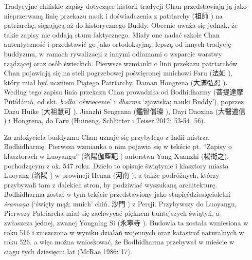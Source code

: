 Tradycyjne chińskie zapisy dotyczące historii tradycji Chan przedstawiają ją jako nieprzerwaną linię przekazu nauk i doświadczenia z patriarchy (祖師 ) na patriarchę, sięgającą aż do historycznego Buddy.
Obecnie uważa się jednak, że takie zapisy nie oddają stanu faktycznego.
Miały one nadać szkole Chan autentyczność i przedstawić go jako ortodoksyjną, lepszą od innych tradycję buddyzmu, w ramach rywalizacji z innymi odłamami o wsparcie warstwy rządzącej oraz osób świeckich.
Pierwsze wzmianki o linii przekazu patriarchów Chan pojawiają się na steli pogrzebowej poświęconej mnichowi Faru (法如 ), który miał być uczniem Piątego Patriarchy, Daman Hongrena (大滿弘忍 ).
Według tego zapisu linia przekazu Chan prowadziła od Bodhidharmy (菩提達摩 Pútídámó, od skt. \textit{bodhi} `oświecenie' i \textit{dharma} `zjawiska; nauki Buddy'), poprzez Dazu Huike  (大祖慧可 ), Jianzhi Sengcana (鑑智僧璨 ), Dayi Daoxina (大醫道信 ) i Hongrena, do Faru
(Huineng, Schlütter i Teiser 2012: 53-54, 56).

Za założyciela buddyzmu Chan uznaje się przybyłego z Indii mistrza Bodhidharmę.
Pierwsza wzmianka o nim pojawia się w tekście pt. ``Zapisy o klasztorach w Luoyangu'' (洛陽伽藍記 ) autorstwa Yang Xuanzhi (楊衒之), pochodzącym z ok. 547 roku.
Dzieło to opisuje świątynie i klasztory miasta Luoyang (洛陽 ) w prowincji Henan (河南 ), a także podróżnych, którzy przybywali tam z dalekich stron, by podziwiać wyszukaną architekturę.
Bodhidharma został w tym tekście przedstawiony jako stupięćdziesięcioletni \textit{śrama\d{n}a} (`święty mąż; mnich' chiń. 沙門 ) z Persji.
Przybywszy do Luoyangu, Pierwszy Patriarcha miał się zachwycać pięknem tamtejszych świątyń, a zwłaszcza jednej, zwanej Yongning Si (永寧寺 ).
Budowla ta została wzniesiona w roku 516 i zniszczona w wyniku działań wojennych oraz katastrof naturalnych w roku 526, a więc można wnioskować, że Bodhidharma przebywał w mieście w ciągu tych dziesięciu lat
(McRae 1986: 17).

